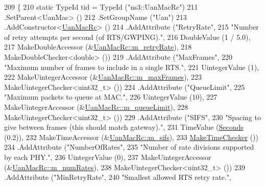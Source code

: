\begin{DoxyCode}
209 \{
210   \textcolor{keyword}{static} TypeId tid = TypeId (\textcolor{stringliteral}{"ns3::UanMacRc"})
211     .SetParent<UanMac> ()
212     .SetGroupName (\textcolor{stringliteral}{"Uan"})
213     .AddConstructor<\hyperlink{classns3_1_1UanMacRc_a6bcb003c0445dcd59276dd4ae0c2dafd}{UanMacRc}> ()
214     .AddAttribute (\textcolor{stringliteral}{"RetryRate"},
215                    \textcolor{stringliteral}{"Number of retry attempts per second (of RTS/GWPING)."},
216                    DoubleValue (1 / 5.0),
217                    MakeDoubleAccessor (&\hyperlink{classns3_1_1UanMacRc_a05998afbcd688ef3c86d762e38ed3927}{UanMacRc::m\_retryRate}),
218                    MakeDoubleChecker<double> ())
219     .AddAttribute (\textcolor{stringliteral}{"MaxFrames"},
220                    \textcolor{stringliteral}{"Maximum number of frames to include in a single RTS."},
221                    UintegerValue (1),
222                    MakeUintegerAccessor (&\hyperlink{classns3_1_1UanMacRc_ad5bf316ed55590834c10630bb5b7740d}{UanMacRc::m\_maxFrames}),
223                    MakeUintegerChecker<uint32\_t> ())
224     .AddAttribute (\textcolor{stringliteral}{"QueueLimit"},
225                    \textcolor{stringliteral}{"Maximum packets to queue at MAC."},
226                    UintegerValue (10),
227                    MakeUintegerAccessor (&\hyperlink{classns3_1_1UanMacRc_a23f9454b170213f244b931801f186efc}{UanMacRc::m\_queueLimit}),
228                    MakeUintegerChecker<uint32\_t> ())
229     .AddAttribute (\textcolor{stringliteral}{"SIFS"},
230                    \textcolor{stringliteral}{"Spacing to give between frames (this should match gateway)."},
231                    TimeValue (\hyperlink{group__timecivil_ga33c34b816f8ff6628e33d5c8e9713b9e}{Seconds} (0.2)),
232                    MakeTimeAccessor (&\hyperlink{classns3_1_1UanMacRc_abf32927f32a30e4a0b6793fee11b53d7}{UanMacRc::m\_sifs}),
233                    \hyperlink{group__time_ga7032965bd4afa578691d88c09e4481c1}{MakeTimeChecker} ())
234     .AddAttribute (\textcolor{stringliteral}{"NumberOfRates"},
235                    \textcolor{stringliteral}{"Number of rate divisions supported by each PHY."},
236                    UintegerValue (0),
237                    MakeUintegerAccessor (&\hyperlink{classns3_1_1UanMacRc_ae6371c67d521311d632f9bd80c657f2f}{UanMacRc::m\_numRates}),
238                    MakeUintegerChecker<uint32\_t> ())
239     .AddAttribute (\textcolor{stringliteral}{"MinRetryRate"},
240                    \textcolor{stringliteral}{"Smallest allowed RTS retry rate."},

\end{DoxyCode}
